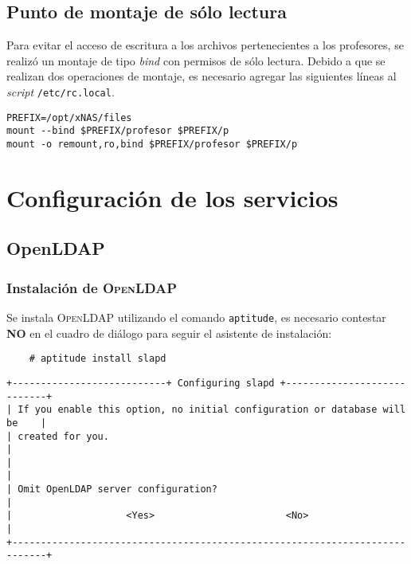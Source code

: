       \subsection {Punto de montaje de s\'{o}lo lectura}

Para evitar el acceso de escritura a los archivos pertenecientes a los profesores, se realiz\'{o} un montaje de tipo \textit{bind} con permisos de s\'{o}lo lectura. Debido a que se realizan dos operaciones de montaje, es necesario agregar las siguientes l\'{i}neas al \textit{script} \texttt{/etc/rc.local}.


{
\scriptsize
\linespread{1}
\begin{verbatim}
PREFIX=/opt/xNAS/files
mount --bind $PREFIX/profesor $PREFIX/p
mount -o remount,ro,bind $PREFIX/profesor $PREFIX/p
\end{verbatim}
}

    \section {Configuraci\'{o}n de los servicios}

      \subsection {OpenLDAP}

          \subsubsection {Instalaci\'{o}n de \textsc{OpenLDAP}}

Se instala \textsc{OpenLDAP} utilizando el comando \texttt{aptitude}, es necesario contestar \textbf{NO} en el cuadro de di\'{a}logo para seguir el asistente de instalaci\'{o}n:

{
\scriptsize
\linespread{1}
\begin{verbatim}
    # aptitude install slapd
\end{verbatim}
}


{
\scriptsize
\linespread{1}
\begin{verbatim}
+---------------------------+ Configuring slapd +----------------------------+
| If you enable this option, no initial configuration or database will be    |
| created for you.                                                           |
|                                                                            |
| Omit OpenLDAP server configuration?                                        |
|                    <Yes>                       <No>                        |
+----------------------------------------------------------------------------+
\end{verbatim}
}

